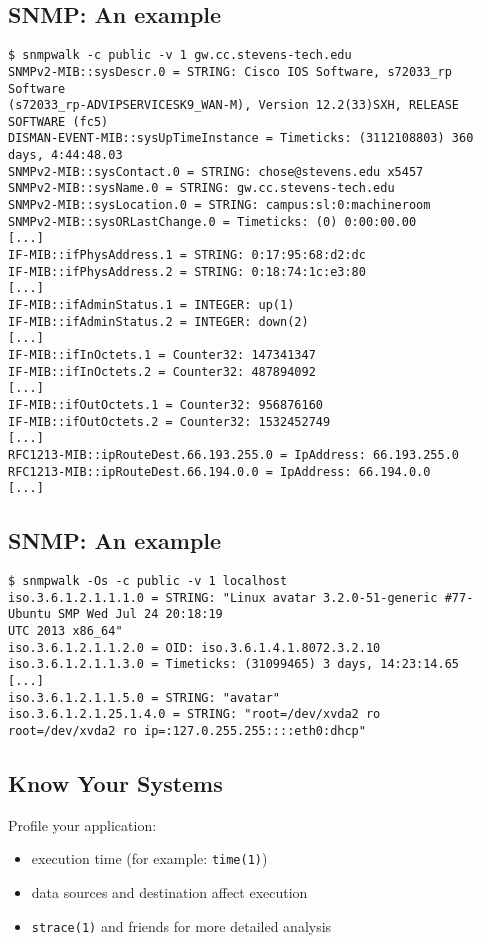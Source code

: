 \documentclass[xga]{xdvislides}
\begin{document}
\subsection{SNMP: An example}
\smallish
\begin{verbatim}
$ snmpwalk -c public -v 1 gw.cc.stevens-tech.edu
SNMPv2-MIB::sysDescr.0 = STRING: Cisco IOS Software, s72033_rp Software
(s72033_rp-ADVIPSERVICESK9_WAN-M), Version 12.2(33)SXH, RELEASE SOFTWARE (fc5)
DISMAN-EVENT-MIB::sysUpTimeInstance = Timeticks: (3112108803) 360 days, 4:44:48.03
SNMPv2-MIB::sysContact.0 = STRING: chose@stevens.edu x5457
SNMPv2-MIB::sysName.0 = STRING: gw.cc.stevens-tech.edu
SNMPv2-MIB::sysLocation.0 = STRING: campus:sl:0:machineroom
SNMPv2-MIB::sysORLastChange.0 = Timeticks: (0) 0:00:00.00
[...]
IF-MIB::ifPhysAddress.1 = STRING: 0:17:95:68:d2:dc
IF-MIB::ifPhysAddress.2 = STRING: 0:18:74:1c:e3:80
[...]
IF-MIB::ifAdminStatus.1 = INTEGER: up(1)
IF-MIB::ifAdminStatus.2 = INTEGER: down(2)
[...]
IF-MIB::ifInOctets.1 = Counter32: 147341347
IF-MIB::ifInOctets.2 = Counter32: 487894092
[...]
IF-MIB::ifOutOctets.1 = Counter32: 956876160
IF-MIB::ifOutOctets.2 = Counter32: 1532452749
[...]
RFC1213-MIB::ipRouteDest.66.193.255.0 = IpAddress: 66.193.255.0
RFC1213-MIB::ipRouteDest.66.194.0.0 = IpAddress: 66.194.0.0
[...]
\end{verbatim}
\Normalsize

\subsection{SNMP: An example}
\smallish
\begin{verbatim}
$ snmpwalk -Os -c public -v 1 localhost
iso.3.6.1.2.1.1.1.0 = STRING: "Linux avatar 3.2.0-51-generic #77-Ubuntu SMP Wed Jul 24 20:18:19
UTC 2013 x86_64"
iso.3.6.1.2.1.1.2.0 = OID: iso.3.6.1.4.1.8072.3.2.10
iso.3.6.1.2.1.1.3.0 = Timeticks: (31099465) 3 days, 14:23:14.65
[...]
iso.3.6.1.2.1.1.5.0 = STRING: "avatar"
iso.3.6.1.2.1.25.1.4.0 = STRING: "root=/dev/xvda2 ro
root=/dev/xvda2 ro ip=:127.0.255.255::::eth0:dhcp"
\end{verbatim}
\Normalsize

\subsection{Know Your Systems}
Profile your application:
\begin{itemize}
	\item execution time (for example: {\tt time(1)})
	\item data sources and destination affect execution
	\item {\tt strace(1)} and friends for more detailed analysis
\end{itemize}
\end{document}
